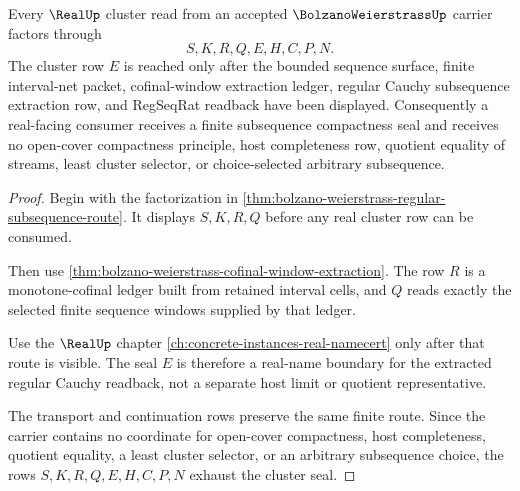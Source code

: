 \begin{theorem}
\label{thm:bolzano-weierstrass-real-cluster-seal}
Every $\RealUp$ cluster read from an accepted $\BolzanoWeierstrassUp$ carrier factors through
$$
S,K,R,Q,E,H,C,P,N.
$$
The cluster row $E$ is reached only after the bounded sequence surface, finite interval-net packet, cofinal-window extraction ledger, regular Cauchy subsequence extraction row, and RegSeqRat readback have been displayed. Consequently a real-facing consumer receives a finite subsequence compactness seal and receives no open-cover compactness principle, host completeness row, quotient equality of streams, least cluster selector, or choice-selected arbitrary subsequence.
\end{theorem}
\begin{proof}
Begin with the factorization in \autoref{thm:bolzano-weierstrass-regular-subsequence-route}. It displays $S,K,R,Q$ before any real cluster row can be consumed.

Then use \autoref{thm:bolzano-weierstrass-cofinal-window-extraction}. The row $R$ is a monotone-cofinal ledger built from retained interval cells, and $Q$ reads exactly the selected finite sequence windows supplied by that ledger.

Use the $\RealUp$ chapter \autoref{ch:concrete-instances-real-namecert} only after that route is visible. The seal $E$ is therefore a real-name boundary for the extracted regular Cauchy readback, not a separate host limit or quotient representative.

The transport and continuation rows preserve the same finite route. Since the carrier contains no coordinate for open-cover compactness, host completeness, quotient equality, a least cluster selector, or an arbitrary subsequence choice, the rows $S,K,R,Q,E,H,C,P,N$ exhaust the cluster seal.
\end{proof}

